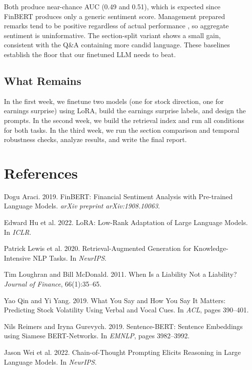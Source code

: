 \documentclass[11pt]{article}
\begin{document}
Both produce near-chance AUC (0.49 and 0.51), which is expected since FinBERT produces only a generic sentiment score. Management prepared remarks tend to be positive regardless of actual performance \citep{Qin2019}, so aggregate sentiment is uninformative. The section-split variant shows a small gain, consistent with the Q\&A containing more candid language. These baselines establish the floor that our finetuned LLM needs to beat.

\subsection{What Remains}

In the first week, we finetune two models (one for stock direction, one for earnings surprise) using LoRA, build the earnings surprise labels, and design the prompts. In the second week, we build the retrieval index and run all conditions for both tasks. In the third week, we run the section comparison and temporal robustness checks, analyze results, and write the final report.

\section*{References}
\begingroup
\renewcommand{\section}[2]{}
\begin{thebibliography}{}

Dogu Araci. 2019.
FinBERT: Financial Sentiment Analysis with Pre-trained Language Models.
\textit{arXiv preprint arXiv:1908.10063}.

Edward Hu et al. 2022.
LoRA: Low-Rank Adaptation of Large Language Models.
In \textit{ICLR}.

Patrick Lewis et al. 2020.
Retrieval-Augmented Generation for Knowledge-Intensive NLP Tasks.
In \textit{NeurIPS}.

Tim Loughran and Bill McDonald. 2011.
When Is a Liability Not a Liability?
\textit{Journal of Finance}, 66(1):35--65.

Yao Qin and Yi Yang. 2019.
What You Say and How You Say It Matters: Predicting Stock Volatility Using Verbal and Vocal Cues.
In \textit{ACL}, pages 390--401.

Nils Reimers and Iryna Gurevych. 2019.
Sentence-BERT: Sentence Embeddings using Siamese BERT-Networks.
In \textit{EMNLP}, pages 3982--3992.

Jason Wei et al. 2022.
Chain-of-Thought Prompting Elicits Reasoning in Large Language Models.
In \textit{NeurIPS}.

\end{thebibliography}
\endgroup
\end{document}
